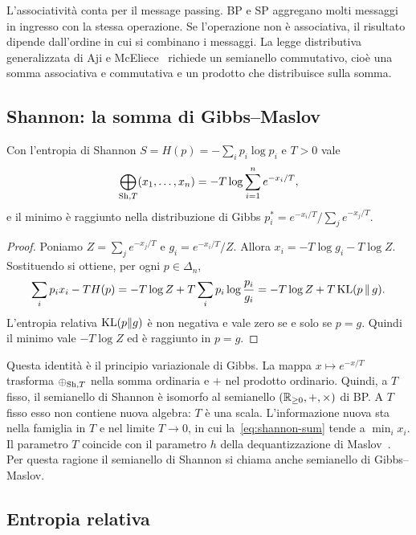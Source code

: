 L'associatività conta per il message passing.
BP e SP aggregano molti messaggi in ingresso con la stessa operazione.
Se l'operazione non è associativa, il risultato dipende dall'ordine in cui si combinano i messaggi.
La legge distributiva generalizzata di Aji e McEliece~\citep{aji2000generalized} richiede un semianello commutativo, cioè una somma associativa e commutativa e un prodotto che distribuisce sulla somma.

\subsection{Shannon: la somma di Gibbs--Maslov}

\begin{proposizione}[MT, Prop.~4.3]
\label{prop:shannon}
Con l'entropia di Shannon $S=H(p)=-\sum_ip_i\log p_i$ e $T>0$ vale
\begin{equation}
\bigoplus_{\mathrm{Sh},T}(x_1,\dots,x_n)=-T\log\sum_{i=1}^ne^{-x_i/T},
\label{eq:shannon-sum}
\end{equation}
e il minimo è raggiunto nella distribuzione di Gibbs $p_i^*=e^{-x_i/T}/\sum_je^{-x_j/T}$.
\end{proposizione}

\begin{proof}
Poniamo $Z=\sum_je^{-x_j/T}$ e $g_i=e^{-x_i/T}/Z$.
Allora $x_i=-T\log g_i-T\log Z$.
Sostituendo si ottiene, per ogni $p\in\Delta_n$,
\begin{equation*}
\sum_ip_ix_i-TH(p)=-T\log Z+T\sum_ip_i\log\frac{p_i}{g_i}=-T\log Z+T\,\mathrm{KL}(p\,\|\,g).
\end{equation*}
L'entropia relativa $\mathrm{KL}(p\|g)$ è non negativa e vale zero se e solo se $p=g$.
Quindi il minimo vale $-T\log Z$ ed è raggiunto in $p=g$.
\end{proof}

Questa identità è il principio variazionale di Gibbs.
La mappa $x\mapsto e^{-x/T}$ trasforma $\oplus_{\mathrm{Sh},T}$ nella somma ordinaria e $+$ nel prodotto ordinario.
Quindi, a $T$ fisso, il semianello di Shannon è isomorfo al semianello $(\mathbb{R}_{\ge0},+,\times)$ di BP.
A $T$ fisso esso non contiene nuova algebra: $T$ è una scala.
L'informazione nuova sta nella famiglia in $T$ e nel limite $T\to0$, in cui la~\eqref{eq:shannon-sum} tende a $\min_ix_i$.
Il parametro $T$ coincide con il parametro $h$ della dequantizzazione di Maslov~\citep{litvinov2007maslov}.
Per questa ragione il semianello di Shannon si chiama anche semianello di Gibbs--Maslov.

\subsection{Entropia relativa}

